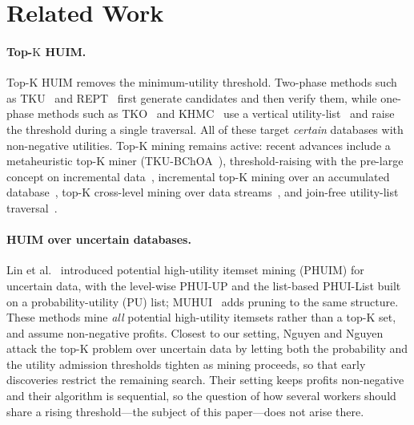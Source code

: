 \documentclass[pdflatex,sn-vancouver-num]{sn-jnl}
\theoremstyle{thmstyleone}%
\theoremstyle{thmstyletwo}%
\theoremstyle{thmstylethree}%
\newcommand{\Kk}{\mathrm{K}}
\begin{document}
\section{Related Work}\label{sec:related}
\paragraph{Top-$\Kk$ HUIM.}
Top-$\Kk$ HUIM removes the minimum-utility threshold. Two-phase methods such as
TKU~\cite{wu2012topk} and REPT~\cite{ryang2015rept} first generate candidates and
then verify them, while one-phase methods such as TKO~\cite{tseng2016topk} and
KHMC~\cite{duong2016khmc} use a vertical utility-list~\cite{liu2012huiminer} and
raise the threshold during a single traversal. All of these target
\emph{certain} databases with non-negative utilities. Top-$\Kk$ mining remains
active: recent advances include a metaheuristic top-$\Kk$ miner
(TKU-BChOA~\cite{mofid2024tku}), threshold-raising with the pre-large concept on
incremental data~\cite{tung2025incremental}, incremental top-$\Kk$ mining over an
accumulated database~\cite{lee2024incremental}, top-$\Kk$ cross-level mining over
data streams~\cite{han2024crosslevel}, and join-free utility-list
traversal~\cite{yan2024nojoin}.

\paragraph{HUIM over uncertain databases.}
Lin et al.~\cite{lin2016phuim} introduced potential high-utility itemset mining
(PHUIM) for uncertain data, with the level-wise PHUI-UP and the list-based
PHUI-List built on a probability-utility (PU) list; MUHUI~\cite{lin2017muhui}
adds pruning to the same structure. These methods mine \emph{all} potential
high-utility itemsets rather than a top-$\Kk$ set, and assume non-negative profits.
Closest to our setting, Nguyen and Nguyen~\cite{nguyen2025dynamic}
attack the top-$\Kk$ problem over uncertain data by letting both the
probability and the utility admission thresholds tighten as mining
proceeds, so that early discoveries restrict the remaining search.
Their setting keeps profits non-negative and their algorithm is
sequential, so the question of how several workers should share a
rising threshold---the subject of this paper---does not arise there.
\end{document}
